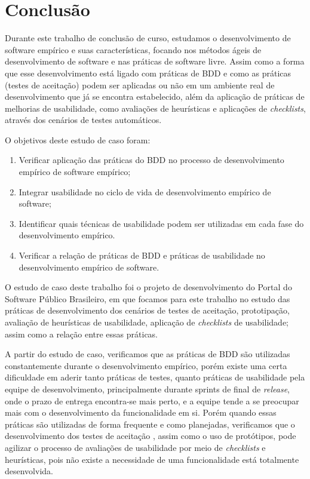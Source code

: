\chapter{Conclusão}
\label{consideracoes-finais}

Durante este trabalho de conclusão de curso, estudamos o desenvolvimento de software empírico e suas características, focando nos métodos ágeis de desenvolvimento de software e nas práticas de software livre. Assim como a forma que esse desenvolvimento está ligado com práticas de BDD e como as práticas (testes de aceitação) podem ser aplicadas ou não em um ambiente real de desenvolvimento que já se encontra estabelecido, além da aplicação de práticas de melhorias de usabilidade, como avaliações de heurísticas e aplicações de \textit{checklists}, através dos cenários de testes automáticos.

O objetivos deste estudo de caso foram:
\begin{enumerate}
\item Verificar aplicação das práticas do BDD no processo de desenvolvimento empírico de software empírico;
\item Integrar usabilidade no ciclo de vida de desenvolvimento empírico de software;
\item Identificar quais técnicas de usabilidade  podem ser utilizadas em cada fase do desenvolvimento empírico.
\item Verificar a relação de práticas de BDD e práticas de usabilidade no desenvolvimento empírico de software.
\end{enumerate}

O estudo de caso deste trabalho foi o projeto de desenvolvimento do Portal do Software Público Brasileiro, em que focamos para este trabalho no estudo das práticas de desenvolvimento dos cenários de testes de aceitação, prototipação, avaliação de heurísticas de usabilidade, aplicação de \textit{checklists} de usabilidade; assim como a relação entre essas práticas.

A partir do estudo de caso, verificamos que as práticas de BDD são utilizadas constantemente durante o desenvolvimento empírico, porém existe uma certa dificuldade em aderir tanto práticas de testes, quanto práticas de usabilidade pela equipe de desenvolvimento, principalmente durante sprints de final de \textit{release}, onde o prazo de entrega encontra-se mais perto, e a equipe tende a se preocupar mais com o desenvolvimento da funcionalidade em si. Porém quando essas práticas são utilizadas de forma frequente e como planejadas, verificamos que o desenvolvimento dos testes de aceitação , assim como o uso de protótipos, pode agilizar o processo de avaliações de usabilidade por meio de \textit{checklists} e heurísticas, pois não existe a necessidade de uma funcionalidade está totalmente desenvolvida. 

